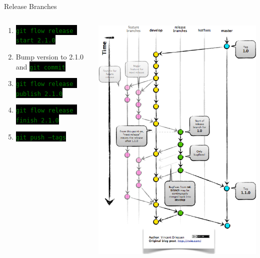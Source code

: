 \documentclass[
14pt,
aspectratio=169,
usenames,
dvipsnames,
x11names]{beamer}
\newcommand{\code}[1]{{\small\colorbox{black}{\textcolor{green}{\texttt{#1}}}}}
\begin{document}
\begin{frame}{Release Branches}
  \begin{columns}
    \begin{column}{.62\linewidth}
      \minipage[c][0.75\textheight][s]{\columnwidth}
      \begin{enumerate} \setlength{\itemsep}{\fill}
      \item \code{git flow release start 2.1.0}
      \item Bump version to 2.1.0 and \code{git commit}
      \item \code{git flow release publish 2.1.0}
      \item \code{git flow release finish 2.1.0}
      \item \code{git push --tags}
      \end{enumerate}
      \endminipage
    \end{column}
    \begin{column}{.38\linewidth}
      \centering
      \includegraphics[width=.7\textwidth,clip,trim=5.5cm 5cm 0 0]{release-branches}
    \end{column}
  \end{columns}
\end{frame}
\end{document}
